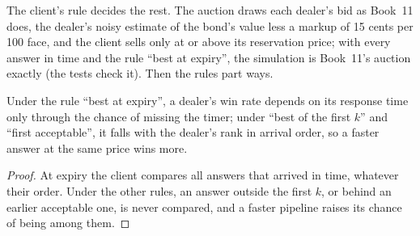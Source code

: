 The client's rule decides the rest. The auction draws each dealer's bid as Book~11 does, the dealer's noisy estimate of the bond's
value less a markup of 15 cents per 100 face, and the client sells only at or above its reservation price; with every answer in time
and the rule ``best at expiry'', the simulation is Book~11's auction exactly (the tests check it). Then the rules part ways.

\label{lst:nw:fixed-income-and-rfq-platform-connectivity:rules}

\begin{proposition}\label{prop:nw:fixed-income-and-rfq-platform-connectivity:speed}
Under the rule ``best at expiry'', a dealer's win rate depends on its response time only through the chance of missing the timer;
under ``best of the first $k$'' and ``first acceptable'', it falls with the dealer's rank in arrival order, so a faster answer at the
same price wins more.
\end{proposition}

\begin{proof}
At expiry the client compares all answers that arrived in time, whatever their order. Under the other rules, an answer outside the
first $k$, or behind an earlier acceptable one, is never compared, and a faster pipeline raises its chance of being among them.
\end{proof}

